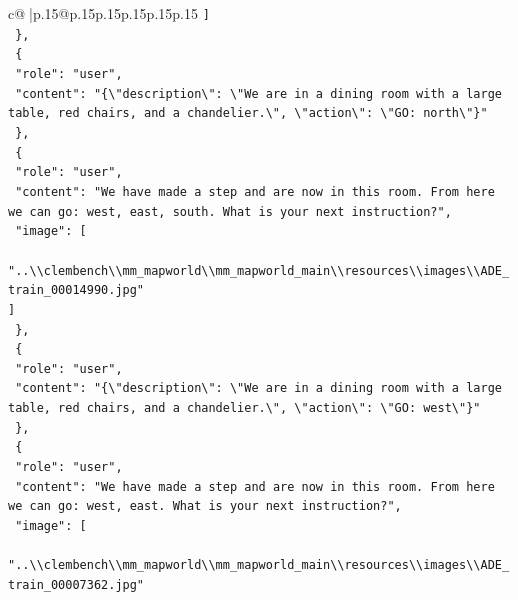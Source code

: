 \documentclass{article}
\begin{document}
{\begin{supertabular}{c@{$\;$}|p{.15\linewidth}@{}p{.15\linewidth}p{.15\linewidth}p{.15\linewidth}p{.15\linewidth}p{.15\linewidth}}
{{{\texttt{    {]}} \\
\texttt{  \},} \\
\texttt{  \{} \\
\texttt{    "role": "user",} \\
\texttt{    "content": "\{\textbackslash{}"description\textbackslash{}": \textbackslash{}"We are in a dining room with a large table, red chairs, and a chandelier.\textbackslash{}", \textbackslash{}"action\textbackslash{}": \textbackslash{}"GO: north\textbackslash{}"\}"} \\
\texttt{  \},} \\
\texttt{  \{} \\
\texttt{    "role": "user",} \\
\texttt{    "content": "We have made a step and are now in this room. From here we can go: west, east, south. What is your next instruction?",} \\
\texttt{    "image": {[}} \\
\texttt{      "..\textbackslash{}\textbackslash{}clembench\textbackslash{}\textbackslash{}mm\_mapworld\textbackslash{}\textbackslash{}mm\_mapworld\_main\textbackslash{}\textbackslash{}resources\textbackslash{}\textbackslash{}images\textbackslash{}\textbackslash{}ADE\_train\_00014990.jpg"} \\
\texttt{    {]}} \\
\texttt{  \},} \\
\texttt{  \{} \\
\texttt{    "role": "user",} \\
\texttt{    "content": "\{\textbackslash{}"description\textbackslash{}": \textbackslash{}"We are in a dining room with a large table, red chairs, and a chandelier.\textbackslash{}", \textbackslash{}"action\textbackslash{}": \textbackslash{}"GO: west\textbackslash{}"\}"} \\
\texttt{  \},} \\
\texttt{  \{} \\
\texttt{    "role": "user",} \\
\texttt{    "content": "We have made a step and are now in this room. From here we can go: west, east. What is your next instruction?",} \\
\texttt{    "image": {[}} \\
\texttt{      "..\textbackslash{}\textbackslash{}clembench\textbackslash{}\textbackslash{}mm\_mapworld\textbackslash{}\textbackslash{}mm\_mapworld\_main\textbackslash{}\textbackslash{}resources\textbackslash{}\textbackslash{}images\textbackslash{}\textbackslash{}ADE\_train\_00007362.jpg"} \\
}}}
\end{supertabular}}
\end{document}
